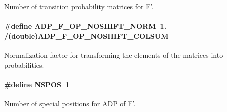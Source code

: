 \-Number of transition probability matrices for \-F'. \hypertarget{adp-tea-f-fk-noshift_8hh_a8e0db13dd0cbef7125af850c9fc25ad9}{
\paragraph[{\-A\-D\-P\-\_\-\-F\-\_\-\-O\-P\-\_\-\-N\-O\-S\-H\-I\-F\-T\-\_\-\-N\-O\-R\-M}]{\setlength{\rightskip}{0pt plus 5cm}\#define {\bf \-A\-D\-P\-\_\-\-F\-\_\-\-O\-P\-\_\-\-N\-O\-S\-H\-I\-F\-T\-\_\-\-N\-O\-R\-M}~1. /(double){\bf \-A\-D\-P\-\_\-\-F\-\_\-\-O\-P\-\_\-\-N\-O\-S\-H\-I\-F\-T\-\_\-\-C\-O\-L\-S\-U\-M}}}\label{adp-tea-f-fk-noshift_8hh_a8e0db13dd0cbef7125af850c9fc25ad9}
\-Normalization factor for transforming the elements of the matrices into probabilities. \hypertarget{adp-tea-f-fk-noshift_8hh_a4822a46657916694abfee9a1c1cdd137}{
\paragraph[{\-N\-S\-P\-O\-S}]{\setlength{\rightskip}{0pt plus 5cm}\#define {\bf \-N\-S\-P\-O\-S}~1}}\label{adp-tea-f-fk-noshift_8hh_a4822a46657916694abfee9a1c1cdd137}
\-Number of special positions for \-A\-D\-P of \-F'. 

